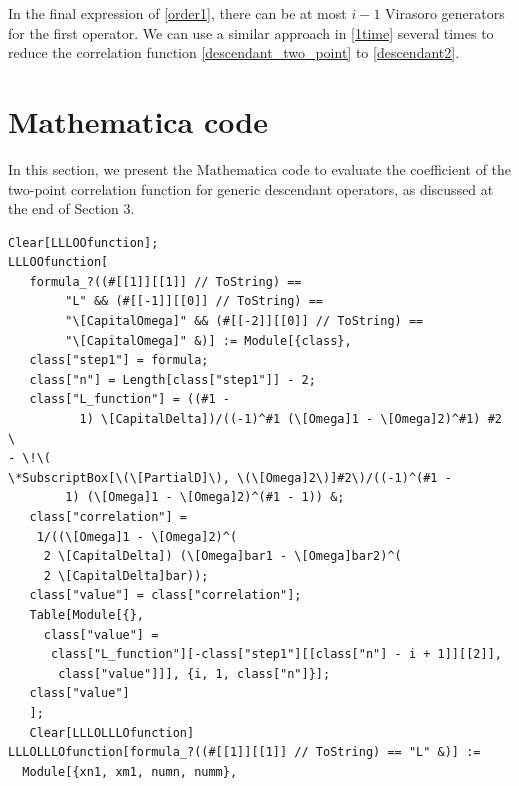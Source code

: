 \documentclass[12pt]{article}
\def\[#1\]{\begin{align}#1\end{align}}
\begin{document}
In the final expression of \eqref{order1}, there can be at most \(i-1\) Virasoro generators for the first operator. We can use a similar approach in \eqref{1time} several times to reduce the correlation function \eqref{descendant_two_point} to \eqref{descendant2}.

\section{{Mathematica code}}\label{appendixB}
In this section, we present the Mathematica code to evaluate the coefficient of the two-point correlation function for generic descendant operators, as discussed at the end of Section 3.
\begin{verbatim} 
Clear[LLLOOfunction];
LLLOOfunction[
   formula_?((#[[1]][[1]] // ToString) == 
        "L" && (#[[-1]][[0]] // ToString) == 
        "\[CapitalOmega]" && (#[[-2]][[0]] // ToString) == 
        "\[CapitalOmega]" &)] := Module[{class},
   class["step1"] = formula;
   class["n"] = Length[class["step1"]] - 2;
   class["L_function"] = ((#1 - 
          1) \[CapitalDelta])/((-1)^#1 (\[Omega]1 - \[Omega]2)^#1) #2 \
- \!\(
\*SubscriptBox[\(\[PartialD]\), \(\[Omega]2\)]#2\)/((-1)^(#1 - 
        1) (\[Omega]1 - \[Omega]2)^(#1 - 1)) &;
   class["correlation"] = 
    1/((\[Omega]1 - \[Omega]2)^(
     2 \[CapitalDelta]) (\[Omega]bar1 - \[Omega]bar2)^(
     2 \[CapitalDelta]bar));
   class["value"] = class["correlation"];
   Table[Module[{}, 
     class["value"] = 
      class["L_function"][-class["step1"][[class["n"] - i + 1]][[2]], 
       class["value"]]], {i, 1, class["n"]}];
   class["value"]
   ];
   Clear[LLLOLLLOfunction]
LLLOLLLOfunction[formula_?((#[[1]][[1]] // ToString) == "L" &)] := 
  Module[{xn1, xm1, numn, numm},
   

\end{verbatim}
\end{document}
